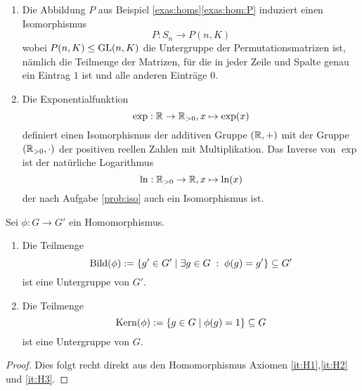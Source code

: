 \documentclass{book}
\begin{document}
\begin{exas}
    \label{exas:isos}
    \begin{enumerate}
        \item Die Abbildung $P$ aus Beispiel \ref{exas:homs}\ref{exas:hom:P} induziert einen Isomorphismus
            \[
                P: S_n \to P(n,K) 
            \]
            wobei $P(n,K) \le \operatorname{GL}(n,K)$ die Untergruppe der
            Permutationsmatrizen ist, nämlich die Teilmenge der Matrizen, für
            die in jeder Zeile und Spalte genau ein Eintrag $1$ ist und alle
            anderen Einträge $0$. 
        \item Die Exponentialfunktion 
            \[
                \exp: \mathbb{R} \to \mathbb{R}_{>0}, x \mapsto \exp(x)
            \]
            definiert einen Isomorphismus der additiven Gruppe $(\mathbb{R},+)$ mit
            der Gruppe $(\mathbb{R}_{>0},\cdot)$ der positiven reellen Zahlen mit
            Multiplikation. Das Inverse von $\exp$ ist der natürliche Logarithmus
            \[
                \ln: \mathbb{R}_{>0} \to \mathbb{R}, x \mapsto \ln(x)
            \]
            der nach Aufgabe \ref{prob:iso} auch ein Isomorphismus ist. 
    \end{enumerate}
\end{exas}

\begin{prop}
    \label{prop:kernbild}
    Sei $\phi: G \to G'$ ein Homomorphismus. 
    \begin{enumerate}
        \item Die Teilmenge 
            \[
                \Bild(\phi) := \{ g' \in G'\; |\; \exists g \in G\;:\; \phi(g) = g' \} \subset G'
            \]
            ist eine Untergruppe von $G'$.
        \item Die Teilmenge 
            \[
                \Kern(\phi) := \{ g \in G\; |\; \phi(g) = 1 \} \subset G
            \]
            ist eine Untergruppe von $G$.
    \end{enumerate}
\end{prop}
\begin{proof}
    Dies folgt recht direkt aus den Homomorphismus Axiomen \ref{it:H1},\ref{it:H2} und \ref{it:H3}.
\end{proof}
\end{document}
